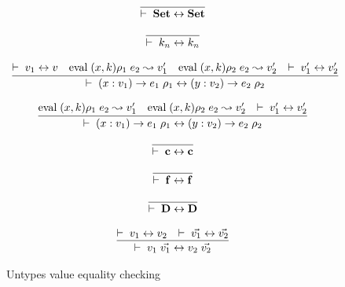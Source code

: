 \begin{figure}[p]
\caption{Untypes value equality checking}

\[\begin{array}{c}
	  \infer{\EqVal{\Set}{\Set}}
          {}
\end{array}\]

\[\begin{array}{c}
	  \infer{\EqVal{k_n}{k_n}}
          {}
\end{array}\]

\[\begin{array}{c}
	  \infer{\EqVal{\VPi{x}{v_1}{e_1}{\rho_1}}{\VPi{y}{v_2}{e_2}{\rho_2}}}
          {   \EqVal{v_1}{v} 
& \Eval{(x,k)\rho_1}{e_2}{v'_1}
& \Eval{(x,k)\rho_2}{e_2}{v'_2}
& \EqVal{v'_1}{v'_2}}
\end{array}\]

\[\begin{array}{c}
	  \infer{\EqVal{\VPi{x}{v_1}{e_1}{\rho_1}}{\VPi{y}{v_2}{e_2}{\rho_2}}}
          {
\Eval{(x,k)\rho_1}{e_2}{v'_1}
& \Eval{(x,k)\rho_2}{e_2}{v'_2}
& \EqVal{v'_1}{v'_2}}
\end{array}\]

\[\begin{array}{c}
	  \infer{\EqVal{\cc}{\cc}}
          {}
\end{array}\]

\[\begin{array}{c}
	  \infer{\EqVal{\ff}{\ff}}
          {}
\end{array}\]

\[\begin{array}{c}
	  \infer{\EqVal{\DD}{\DD}}
          {}
\end{array}\]


\[\begin{array}{c}
	  \infer{\EqVal{v_1 \; \vec{v_1}}{v_2 \; \vec{v_2}}}
          {\EqVal{v_1}{v_2} & \EqVal{\vec{v_1}}{\vec{v_2}}}
\end{array}\]


\end{figure}

